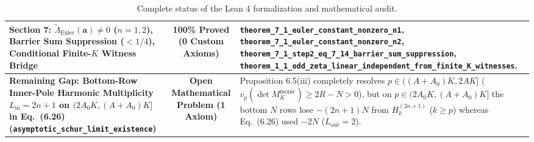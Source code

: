 \documentclass[11pt,a4paper]{article}
\begin{document}
\begin{table}[h!]
\begin{tabular}{p{5.2cm}cp{7.5cm}}
\midrule
\textbf{Section 7: $\widetilde{\Lambda}_{\mathrm{Euler}}(\mathbf{a}) \neq 0$ ($n=1,2$), Barrier Sum Suppression ($< 1/4$), Conditional Finite-$K$ Witness Bridge} & \textcolor{green!50!black}{\textbf{100\% Proved (0 Custom Axioms)}} & \texttt{theorem\_7\_1\_euler\_constant\_nonzero\_n1}, \texttt{theorem\_7\_1\_euler\_constant\_nonzero\_n2}, \texttt{theorem\_7\_1\_step2\_eq\_7\_14\_barrier\_sum\_suppression}, \texttt{theorem\_1\_1\_odd\_zeta\_linear\_independent\_from\_finite\_K\_witnesses}. \\
\midrule
\textbf{Remaining Gap: Bottom-Row Inner-Pole Harmonic Multiplicity $L_{\mathrm{in}} = 2n+1$ on $(2A_0 K, (A+A_0)K]$ in Eq.\ (6.26) (\texttt{asymptotic\_schur\_limit\_existence})} & \textcolor{red!70!black}{\textbf{Open Mathematical Problem (1 Axiom)}} & Proposition 6.5(iii) completely resolves $p \in ((A+A_0)K, 2AK]$ ($v_p(\det M_K^{\mathrm{monic}}) \ge 2R - N > 0$), but on $p \in (2A_0 K, (A+A_0)K]$ the bottom $N$ rows lose $-(2n+1)N$ from $H_k^{(2n+1)}$ ($k \ge p$) whereas Eq.\ (6.26) used $-2N$ ($L_{\mathrm{out}} = 2$). \\
\bottomrule
\end{tabular}
\caption{Complete status of the Lean 4 formalization and mathematical audit.}
\label{tab:status}
\end{table}
\end{document}
